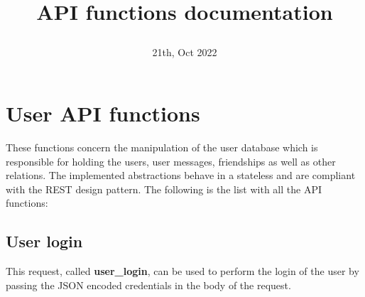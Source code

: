 \documentclass[a4paper,12pt]{article}
\title{\par\noindent\huge{API functions documentation}}
\date{21th, Oct 2022}
\begin{document}
	\maketitle
	\newpage

	\tableofcontents
	\newpage

    \section[User API functions]{User API functions}
        
        \vspace{10pt}

        These functions concern the manipulation of the user database which is responsible for holding the users, user messages, friendships as well as other relations. The implemented abstractions behave in a stateless and are compliant with the REST design pattern. The following is the list with all the API functions:

        \subsection[User login]{User login}

            \vspace{10pt}

            This request, called \textbf{user\_login}, can be used to perform the login of the user by passing the JSON encoded credentials in the body of the request.
\end{document}

